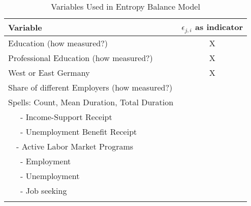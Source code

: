\renewcommand{\arraystretch}{0.8}
\begin{table*}[h]
 \caption{Variables Used in Entropy Balance Model}\label{tab:depvars}
\begin{tabular}{lc}
  \addlinespace \toprule\addlinespace
 Variable & $\epsilon_{j,i}$ as indicator \\
\midrule
Education (how measured?) & X \\ 
Professional Education (how measured?) & X \\ 
West or East Germany & X\\ 
\addlinespace			
Share of different Employers  (how measured?)\\ 
Spells: Count, Mean Duration, Total Duration\\ 
\ \ \ - Income-Support Receipt   \\ 
\ \ \ - Unemployment Benefit Receipt \\ 
 \ \ - Active Labor Market Programs \\ 
\ \ \  - Employment\\ 
 \ \ \ - Unemployment \\ 
\ \ \ - Job seeking \\ 
 \addlinespace
 \bottomrule
 \end{tabular}
\end{table*}
